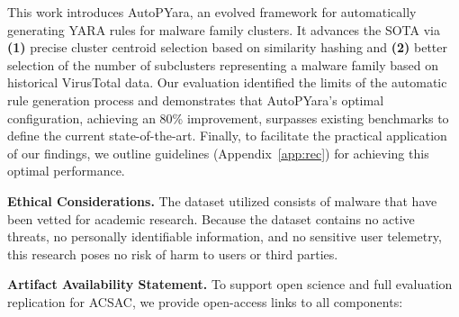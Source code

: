 \noindent This work introduces AutoPYara, an evolved framework for automatically generating YARA rules for malware family clusters. It advances the SOTA via \textbf{(1)} precise cluster centroid selection based on similarity hashing and \textbf{(2)} better selection of the number of subclusters representing a malware family based on historical VirusTotal data. Our evaluation identified the limits of the automatic rule generation process and demonstrates that AutoPYara's optimal configuration, achieving an 80\% improvement, surpasses existing benchmarks to define the current state-of-the-art. Finally, to facilitate the practical application of our findings, we outline guidelines (Appendix~\ref{app:rec}) for achieving this optimal performance.

\noindent \textbf{Ethical Considerations.} The dataset utilized consists of malware that have been vetted for academic research. Because the dataset contains no active threats, no personally identifiable information, and no sensitive user telemetry, this research poses no risk of harm to users or third parties.

\noindent \textbf{Artifact Availability Statement.} To support open science and full evaluation replication for ACSAC, we provide open-access links to all components:


